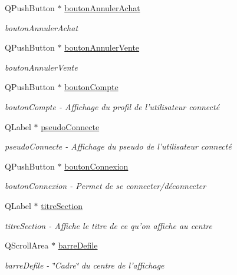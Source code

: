 \begin{DoxyCompactItemize}
Q\-Push\-Button $\ast$ \hyperlink{class_ma_fenetre_ab9146d75613df065eeed16431a95b469}{bouton\-Annuler\-Achat}
\begin{DoxyCompactList}\small\item\em bouton\-Annuler\-Achat \end{DoxyCompactList}\item 
Q\-Push\-Button $\ast$ \hyperlink{class_ma_fenetre_a5724730df59031b3e2275b9c82820446}{bouton\-Annuler\-Vente}
\begin{DoxyCompactList}\small\item\em bouton\-Annuler\-Vente \end{DoxyCompactList}\item 
Q\-Push\-Button $\ast$ \hyperlink{class_ma_fenetre_abfdb548dc88cf56eae01fd20be7b052a}{bouton\-Compte}
\begin{DoxyCompactList}\small\item\em bouton\-Compte -\/ Affichage du profil de l'utilisateur connecté \end{DoxyCompactList}\item 
Q\-Label $\ast$ \hyperlink{class_ma_fenetre_ae7932944c172401e793af721335e7c3d}{pseudo\-Connecte}
\begin{DoxyCompactList}\small\item\em pseudo\-Connecte -\/ Affichage du pseudo de l'utilisateur connecté \end{DoxyCompactList}\item 
Q\-Push\-Button $\ast$ \hyperlink{class_ma_fenetre_a6654bb6885a843d1a6ad9399eb7d0c36}{bouton\-Connexion}
\begin{DoxyCompactList}\small\item\em bouton\-Connexion -\/ Permet de se connecter/déconnecter \end{DoxyCompactList}\item 
Q\-Label $\ast$ \hyperlink{class_ma_fenetre_ac4749f9608f7c8d6e5d60434ddbedfc5}{titre\-Section}
\begin{DoxyCompactList}\small\item\em titre\-Section -\/ Affiche le titre de ce qu'on affiche au centre \end{DoxyCompactList}\item 
Q\-Scroll\-Area $\ast$ \hyperlink{class_ma_fenetre_a4f199f65ae682c48c837875a486d2f3f}{barre\-Defile}
\begin{DoxyCompactList}\small\item\em barre\-Defile -\/ \char`\"{}\-Cadre\char`\"{} du centre de l'affichage \end{DoxyCompactList}\item 

\end{DoxyCompactItemize}
